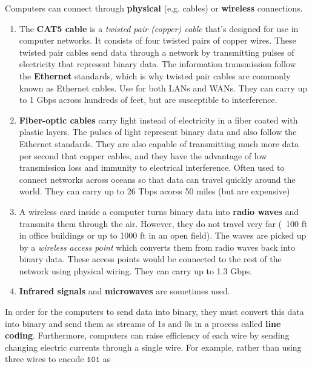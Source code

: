 \documentclass{article}
\begin{document}
    Computers can connect through \textbf{physical} (e.g. cables) or \textbf{wireless} connections. 

    \begin{enumerate}
      \item The \textbf{CAT5 cable} is a \textit{twisted pair (copper) cable} that's designed for use in computer networks. It consists of four twisted pairs of copper wires. These twisted pair cables send data through a network by transmitting pulses of electricity that represent binary data. The information transmission follow the \textbf{Ethernet} standards, which is why twisted pair cables are commonly known as Ethernet cables. Use for both LANs and WANs. They can carry up to 1 Gbps across hundreds of feet, but are susceptible to interference. 

      \item \textbf{Fiber-optic cables} carry light instead of electricity in a fiber coated with plastic layers. The pulses of light represent binary data and also follow the Ethernet standards. They are also capable of transmitting much more data per second that copper cables, and they have the advantage of low transmission loss and immunity to electrical interference. Often used to connect networks across oceans so that data can travel quickly around the world. They can carry up to 26 Tbps acorss 50 miles (but are expensive)

      \item A wireless card inside a computer turns binary data into \textbf{radio waves} and transmits them through the air. However, they do not travel very far (~100 ft in office buildings or up to 1000 ft in an open field). The waves are picked up by a \textit{wireless access point} which converts them from radio waves back into binary data. These access points would be connected to the rest of the network using physical wiring. They can carry up to 1.3 Gbps. 

      \item \textbf{Infrared signals} and \textbf{microwaves} are sometimes used. 
    \end{enumerate}


    In order for the computers to send data into binary, they must convert this data into binary and send them as streams of 1s and 0s in a process called \textbf{line coding}. Furthermore, computers can raise efficiency of each wire by sending changing electric currents through a single wire. For example, rather than using three wires to encode $\texttt{101}$ as 
\end{document}
